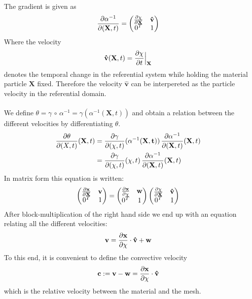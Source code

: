 The gradient is given as
\begin{align}
\frac{\partial \alpha^{-1}}{\partial (\mathbf{X},t)} = \begin{pmatrix} \frac{\partial \chi}{\partial \mathbf{X}} & \mathbf{\hat{v}} \\
											0^T & 1
								\end{pmatrix} \label{alpha_Gradient}
\end{align}
Where the velocity 
\begin{align} \mathbf{\hat{v}}(\mathbf{X},t) = \frac{\partial \chi}{\partial t}\Big{|}_{\mathbf{X}} \label{MeshVel}
\end{align}
denotes the temporal change in the referential system while holding the material particle $\mathbf{X}$ fixed. Therefore the velocity $\mathbf{\hat{v}}$ can be interpereted as the particle velocity in the referential domain. \\
\\
We define $\theta = \gamma \, \circ \, \alpha^{-1} = \gamma(\alpha^{-1}(\mathbf{X},t))$ and obtain a relation between the different velocities by differentiating $\theta$. 
\begin{align}
\frac{\partial \theta}{\partial (X,t)}(\mathbf{X},t) & = \frac{\partial \gamma}{\partial (\chi,t)}(\alpha^{-1}(\mathbf{X,t}))\, \frac{\partial \alpha^{-1}}{\partial (\mathbf{X},t)}(\mathbf{X},t) \\
& = \frac{\partial \gamma}{\partial (\chi,t)}(\chi,t)\, \frac{\partial \alpha^{-1}}{\partial (\mathbf{X},t)}(\mathbf{X},t)
\end{align}
In matrix form this equation is written:
\begin{align}
	\begin{pmatrix} \frac{\partial \mathbf{x}}{\partial \mathbf{X}} & \mathbf{v} \\
											0^T & 1
	\end{pmatrix} 
	= 
	\begin{pmatrix} \frac{\partial \mathbf{x}}{\partial \chi} & \mathbf{w} \\
											0^T & 1
	\end{pmatrix}
	\begin{pmatrix} \frac{\partial \chi}{\partial \mathbf{X}} & \mathbf{\hat{v}} \\
											0^T & 1
	\end{pmatrix}
\end{align}
After block-multiplication of the right hand side we end up with an equation relating all the different velocities:
\begin{align}
\mathbf{v} = \frac{\partial \mathbf{x}}{\partial \chi}\cdot \mathbf{\hat{v}} + \mathbf{w}
\end{align}
To this end, it is convenient to define the convective velocity
\begin{align}
\mathbf{c}:= \mathbf{v}-\mathbf{w} = \frac{\partial \mathbf{x}}{\partial \chi}\cdot \mathbf{\hat{v}}
\end{align}
which is the relative velocity between the material and the mesh. 




